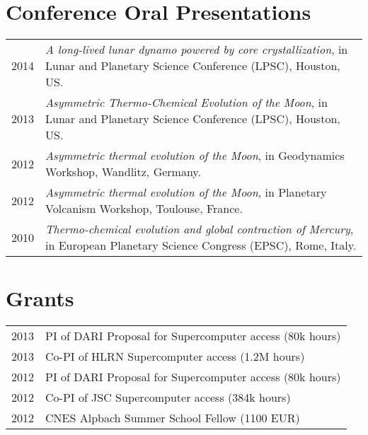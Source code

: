 \documentclass[11pt,fullpage]{article}
\begin{document}
\section*{Conference Oral Presentations}

\begin{longtable}{p{0.3in}|p{5.5in}}
	2014 & \emph{A long-lived lunar dynamo powered by core crystallization}, in Lunar and Planetary Science 
Conference (LPSC), Houston, US. \\
	2013 & \emph{Asymmetric Thermo-Chemical Evolution of the Moon}, in Lunar and Planetary Science
Conference (LPSC), Houston, US. \\
	2012 & \emph{Asymmetric thermal evolution of the Moon}, in Geodynamics Workshop, Wandlitz, Germany. \\
	2012 & \emph{Asymmetric thermal evolution of the Moon}, in Planetary Volcanism Workshop, Toulouse, France. \\
	2010 & \emph{Thermo-chemical evolution and global contraction of Mercury}, in European Planetary
Science Congress (EPSC), Rome, Italy.
\end{longtable}

\setlength{\extrarowheight}{5pt}

\section*{Grants}

\begin{longtable}{p{0.3in}|p{5.5in}}

 2013 & PI of DARI Proposal for Supercomputer access (80k hours) \\
 2013 & Co-PI of HLRN Supercomputer access (1.2M hours) \\
 2012 & PI of DARI Proposal for Supercomputer access (80k hours) \\
 2012 & Co-PI of JSC Supercomputer access (384k hours) \\
 2012 & CNES Alpbach Summer School Fellow (1100 EUR) \\

\end{longtable}


\end{document}
